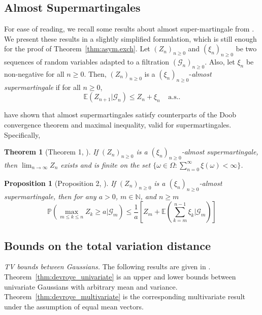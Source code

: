 \documentclass{article}
\newtheorem{theorem}{Theorem}
\newtheorem{proposition}{Proposition}
\theoremstyle{definition}
\renewcommand{\&}{and}
\begin{document}
\subsection{Almost Supermartingales}
For ease of reading, we recall some results about almost super-martingale from \cite{robbins1971convergence}. We present these results in a slightly simplified formulation, which is still enough for the proof of Theorem~\ref{thm:asym.exch}. Let $(Z_{n})_{n\geq 0}$ and $(\xi_{n})_{n\geq 0}$ be two sequences of random variables adapted to a filtration $(\mathcal{G}_{n})_{n\geq 0}$. Also, let $\xi_{n}$ be non-negative for all $n\geq 0$. Then, $(Z_{n})_{n\geq 0}$ is a $(\xi_{n})_{n\geq 0}$-\textit{almost supermartingale} if for all $n\geq 0$,
\begin{equation*}
    \mathbb{E}(Z_{n+1}|\mathcal{G}_{n}) \leq Z_{n} + \xi_{n} \ \ \ \ \ \text{a.s.}.
\end{equation*}

\cite{robbins1971convergence} have shown that almost supermartingales satisfy counterparts of the Doob convergence theorem and maximal inequality, valid for supermartingales. Specifically, 

\begin{theorem}[Theorem 1, \cite{robbins1971convergence}] \label{th:robsig}
    If $(Z_{n})_{n\geq 0}$ is a $(\xi_{n})_{n\geq 0}$-almost supermartingale, then $\lim_{n\to \infty} Z_{n}$ exists and is finite on the set $\{ \omega\in \Omega: \sum_{n=0}^{\infty} \xi(\omega) < \infty \}$.
\end{theorem}

\begin{proposition}[Proposition 2, \cite{robbins1971convergence}] \label{eq:max.ineq.robb}
     If $(Z_{n})_{n\geq 0}$ is a $(\xi_{n})_{n\geq 0}$-almost supermartingale, then for any $a>0$, $m\in \mathbb{N}$, and $n\geq m$
     \begin{equation*}
         \mathbb{P}\left( \max_{m\leq k\leq n} Z_{k} \geq a |\mathcal{G}_{m}\right) \leq \frac{1}{a}\left[Z_{m} + \mathbb{E}\left(\sum_{k=m}^{n-1}\xi_{k} |\mathcal{G}_{m}\right)\right]
     \end{equation*}
\end{proposition}


\subsection{Bounds on the total variation distance}\label{sec:background_tv_bounds}

\noindent \textit{TV bounds between Gaussians.} The following results are given in \cite{devroye2018total}. Theorem~\ref{thm:devroye_univariate} is an upper and lower bounds between univariate Gaussians with arbitrary mean and variance. Theorem~\ref{thm:devroye_multivariate} is the corresponding multivariate result under the assumption of equal mean vectors.
\end{document}
